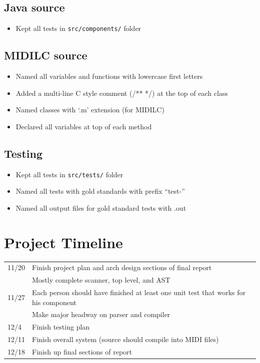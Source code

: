 \documentclass[12pt,A4]{book}
\begin{document}
\subsection{Java source}
\begin{itemize}
\item Kept all tests in \verb|src/components/| folder
\end{itemize}
\subsection{MIDILC source}
\begin{itemize}
\item Named all variables and functions with lowercase first letters
\item Added a multi-line C style comment (/** */) at the top of each class
\item Named classes with `.m' extension (for MIDILC)
\item Declared all variables at top of each method
\end{itemize}
\subsection{Testing}
\begin{itemize}
\item Kept all tests in \verb|src/tests/| folder
\item Named all tests with gold standards with prefix ``test-''
\item Named all output files for gold standard tests with .out
\end{itemize}
\section{Project Timeline}
\begin{tabular}{l p{}}
11/20 & Finish project plan and arch design sections of final report\\
      & Mostly complete scanner, top level, and AST\\
11/27 & Each person should have finished at least one unit test that works for his component\\
      & Make major headway on parser and compiler\\
12/4 & Finish testing plan\\
12/11 & Finish overall system (source should compile into MIDI files)\\
12/18 & Finish up final sections of report\\
\end{tabular}
\end{document}
